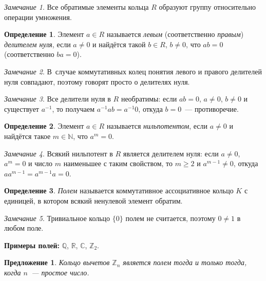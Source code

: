 \documentclass[a4paper,10pt]{amsart}
\def\CC{{\mathbb C}}%
\def\ZZ{{\mathbb Z}}%
\def\RR{{\mathbb R}}%
\def\NN{{\mathbb N}}%
\def\QQ{{\mathbb Q}}%
\newtheorem{proposition}{Предложение}
\theoremstyle{definition}
\newtheorem{definition}{Определение}
\theoremstyle{remark}
\newtheorem{remark}{Замечание}
\begin{document}
\begin{remark}
Все обратимые элементы кольца $R$ образуют группу относительно
операции умножения.
\end{remark}

\begin{definition}
Элемент $a\in R$ называется \textit{левым} (соответственно
\textit{правым}) \textit{делителем нуля}, если $a \ne 0$ и найдётся
такой $b \in R$, $b\ne 0$, что $ab=0$ (соответственно $ba = 0$).
\end{definition}

\begin{remark}
В~случае коммутативных колец понятия левого и правого делителей нуля
совпадают, поэтому говорят просто о делителях нуля.
\end{remark}

\begin{remark}
Все делители нуля в $R$ необратимы: если $ab = 0$, $a \ne 0$, $b \ne
0$ и существует $a^{-1}$, то получаем $a^{-1}ab = a^{-1}0$, откуда
$b = 0$~--- противоречие.
\end{remark}

\begin{definition}
Элемент $a\in R$ называется {\it нильпотентом}, если $a \ne 0$ и
найдётся такое $m \in \NN$, что $a^m=0$.
\end{definition}

\begin{remark}
Всякий нильпотент в $R$ является делителем нуля: если $a \ne 0$,
$a^m = 0$ и число $m$ наименьшее с таким свойством, то $m \geqslant
2$ и $a^{m-1} \ne 0$, откуда $aa^{m-1} = a^{m-1}a = 0$.
\end{remark}


\begin{definition}
{\it Полем} называется коммутативное ассоциативное кольцо $K$ с
единицей, в котором всякий ненулевой элемент обратим.
\end{definition}

\begin{remark}
Тривиальное кольцо $\lbrace 0 \rbrace$ полем не считается, поэтому
$0 \ne 1$ в любом поле.
\end{remark}

\textbf{Примеры полей:} $\QQ$, $\RR$, $\CC$, $\ZZ_2$.

\begin{proposition}
Кольцо вычетов $\ZZ_n$ является полем тогда и только тогда, когда
$n$~--- простое число.
\end{proposition}
\end{document}
